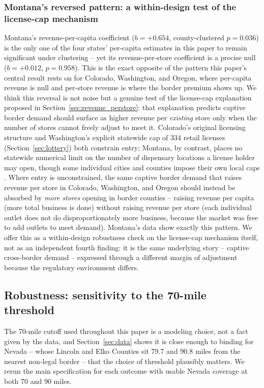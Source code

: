 ﻿\documentclass{article}
\begin{document}
\subsubsection{Montana's reversed pattern: a within-design test of the license-cap mechanism}
\label{sec:montana_mechanism}

Montana's revenue-per-capita coefficient ($b=+0.654$, county-clustered $p=0.036$) is the only one of the
four states' per-capita estimates in this paper to remain significant under clustering -- yet its
revenue-per-store coefficient is a precise null ($b=+0.012$, $p=0.958$). This is the exact opposite of the
pattern this paper's central result rests on for Colorado, Washington, and Oregon, where per-capita revenue
is null and per-store revenue is where the border premium shows up. We think this reversal is not noise
but a genuine test of the license-cap explanation proposed in Section~\ref{sec:revenue_perstore}: that
explanation predicts captive border demand should surface as higher revenue per \emph{existing} store only
when the number of stores cannot freely adjust to meet it. Colorado's original licensing structure and
Washington's explicit statewide cap of 334 retail licenses (Section~\ref{sec:lottery}) both constrain
entry; Montana, by contrast, places no statewide numerical limit on the number of dispensary locations a
license holder may open, though some individual cities and counties impose their own local caps
\citep{MTCannabisLicensing}. Where entry is unconstrained, the same captive border demand that raises
revenue per store in Colorado, Washington, and Oregon should instead be absorbed by \emph{more stores}
opening in border counties -- raising revenue per capita (more total business is done) without raising
revenue per store (each individual outlet does not do disproportionately more business, because the market
was free to add outlets to meet demand). Montana's data show exactly this pattern. We offer this as a
within-design robustness check on the license-cap mechanism itself, not as an independent fourth finding:
it is the same underlying story -- captive cross-border demand -- expressed through a different margin of
adjustment because the regulatory environment differs.

\subsection{Robustness: sensitivity to the 70-mile threshold}
\label{sec:threshold}

The 70-mile cutoff used throughout this paper is a modeling choice, not a fact given by the data, and
Section~\ref{sec:data} shows it is close enough to binding for Nevada -- whose Lincoln and Elko Counties
sit 79.7 and 90.8 miles from the nearest non-legal border -- that the choice of threshold plausibly matters.
We rerun the main specification for each outcome with usable Nevada coverage at both 70 and 90 miles.
\end{document}
